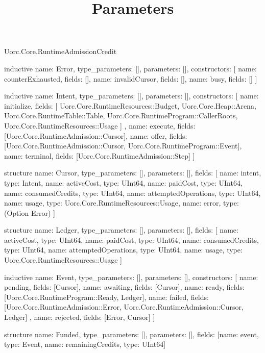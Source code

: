 \begin{lexlean}{Uorc.Core.RuntimeAdmissionCredit}
\title{Parameters}
\begin{semanticmodule}
inductive{
  name: Error,
  type_parameters: [],
  parameters: [],
  constructors: [
    {name: counterExhausted, fields: []},
    {name: invalidCursor, fields: []},
    {name: busy, fields: []}
  ]
}

inductive{
  name: Intent,
  type_parameters: [],
  parameters: [],
  constructors: [
    {
      name: initialize,
      fields: [
        Uorc.Core.RuntimeResources::Budget,
        Uorc.Core.Heap::Arena,
        Uorc.Core.RuntimeTable::Table,
        Uorc.Core.RuntimeProgram::CallerRoots,
        Uorc.Core.RuntimeResources::Usage
      ]
    },
    {name: execute, fields: [Uorc.Core.RuntimeAdmission::Cursor]},
    {name: offer, fields: [Uorc.Core.RuntimeAdmission::Cursor, Uorc.Core.RuntimeProgram::Event]},
    {name: terminal, fields: [Uorc.Core.RuntimeAdmission::Step]}
  ]
}

structure{
  name: Cursor,
  type_parameters: [],
  parameters: [],
  fields: [
    {name: intent, type: Intent},
    {name: activeCost, type: UInt64},
    {name: paidCost, type: UInt64},
    {name: consumedCredits, type: UInt64},
    {name: attemptedOperations, type: UInt64},
    {name: usage, type: Uorc.Core.RuntimeResources::Usage},
    {name: error, type: (Option Error)}
  ]
}

structure{
  name: Ledger,
  type_parameters: [],
  parameters: [],
  fields: [
    {name: activeCost, type: UInt64},
    {name: paidCost, type: UInt64},
    {name: consumedCredits, type: UInt64},
    {name: attemptedOperations, type: UInt64},
    {name: usage, type: Uorc.Core.RuntimeResources::Usage}
  ]
}

inductive{
  name: Event,
  type_parameters: [],
  parameters: [],
  constructors: [
    {name: pending, fields: [Cursor]},
    {name: awaiting, fields: [Cursor]},
    {name: ready, fields: [Uorc.Core.RuntimeProgram::Ready, Ledger]},
    {
      name: failed,
      fields: [Uorc.Core.RuntimeAdmission::Error, Uorc.Core.RuntimeAdmission::Cursor, Ledger]
    },
    {name: rejected, fields: [Error, Cursor]}
  ]
}

structure{
  name: Funded,
  type_parameters: [],
  parameters: [],
  fields: [{name: event, type: Event}, {name: remainingCredits, type: UInt64}]
}


\end{semanticmodule}
\end{lexlean}
